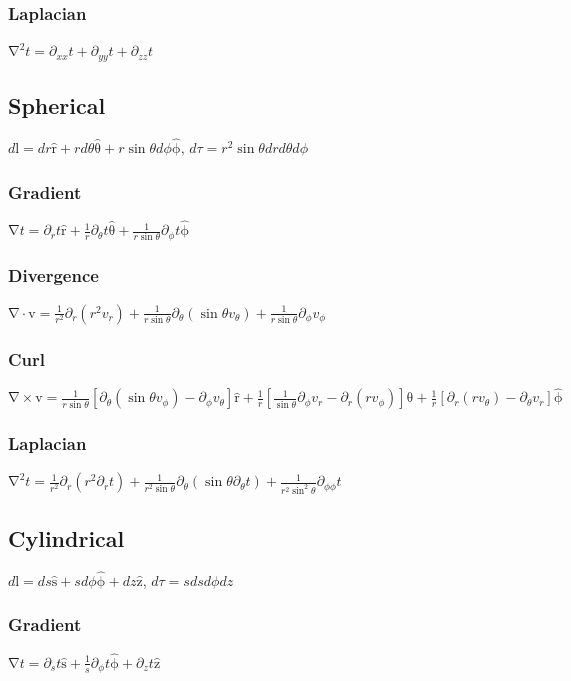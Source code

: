 \documentclass[10pt,landscape,letterpaper]{cheatsheet}
\newcommand{\bv}[1]{\bm{\mathrm{#1}}}
\newcommand{\uv}[1]{\hat{\bv{{#1}}}}
\newcommand{\uz}{\uv{z}}
\newcommand{\grad}{\bv{\nabla}}
\begin{document}
\subsubsection*{Laplacian}
$
        \grad^2t=\partial_{xx}t+\partial_{yy}t+\partial_{zz}t
$

\subsection*{Spherical}
$d\bv{l}=dr\uv{r}+rd\theta\uv{\theta}+r\sin\theta d\phi\uv{\phi}$, $d\tau=r^2\sin\theta drd\theta d\phi$
\subsubsection*{Gradient}
$
        \grad t =\partial_rt\uv{r}+\frac{1}{r}\partial_\theta t\uv{\theta}+\frac{1}{r\sin\theta}\partial_\phi t\uv{\phi}
$
\subsubsection*{Divergence}
$
        \grad\cdot \bv{v}  =\frac{1}{r^2}\partial_r(r^2v_r)                           
                           +\frac{1}{r\sin\theta}\partial_\theta(\sin\theta v_\theta) 
                           +\frac{1}{r\sin\theta}\partial_\phi v_\phi
$
\subsubsection*{Curl}
$
        \grad\times \bv{v}  =\frac{1}{r\sin\theta}\left[\partial_\theta(\sin\theta v_\phi) -\partial_\phi v_\theta\right]\uv{r} 
                            +\frac{1}{r}\left[\frac{1}{\sin\theta}\partial_\phi v_r-\partial_r(rv_\phi)\right]\uv{\theta}       
                            +\frac{1}{r}\left[\partial_r(rv_\theta)-\partial_\theta v_r\right]\uv{\phi}
$
\subsubsection*{Laplacian}
$
        \grad^2t =\frac{1}{r^2}\partial_r(r^2\partial_r t)                            
                  +\frac{1}{r^2\sin\theta}\partial_\theta(\sin\theta\partial_\theta t) 
                  +\frac{1}{r^2\sin^2\theta}\partial_{\phi\phi}t
$
\subsection*{Cylindrical}
$d\bv{l}=ds\uv{s}+sd\phi\uv{\phi}+dz\uz$, $d\tau=sds d\phi dz$
\subsubsection*{Gradient}
$
        \grad t =\partial_st\uv{s}+\frac{1}{s}\partial_\phi t\uv{\phi}+\partial_z t\uz
$
\end{document}
